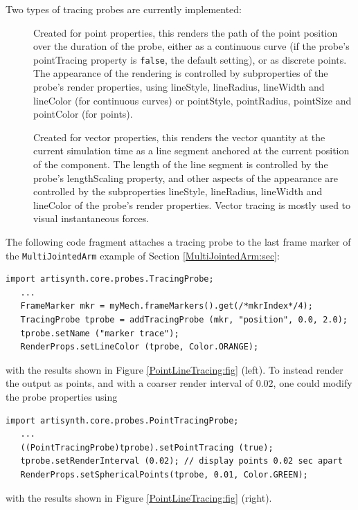 Two types of tracing probes are currently implemented:

\begin{description}

\item[]\mbox{}

Created for point properties, this renders the path of the point position over
the duration of the probe, either as a continuous curve (if the probe's {\sf
pointTracing} property is {\tt false}, the default setting), or as discrete
points. The appearance of the rendering is controlled by subproperties of the
probe's render properties, using {\sf lineStyle}, {\sf lineRadius}, {\sf
lineWidth} and {\sf lineColor} (for continuous curves) or {\sf pointStyle},
{\sf pointRadius}, {\sf pointSize} and {\sf pointColor} (for points).

\item[]\mbox{}

Created for vector properties, this renders the vector quantity at the current
simulation time as a line segment anchored at the current position of the
component. The length of the line segment is controlled by the probe's {\sf
lengthScaling} property, and other aspects of the appearance are controlled by
the subproperties {\sf lineStyle}, {\sf lineRadius}, {\sf lineWidth} and {\sf
lineColor} of the probe's render properties. Vector tracing is mostly used to
visual instantaneous forces.

\end{description}

The following code fragment attaches a tracing probe to the last frame marker
of the {\tt MultiJointedArm} example of Section \ref{MultiJointedArm:sec}:
%
\begin{lstlisting}[]
import artisynth.core.probes.TracingProbe;
   ...
   FrameMarker mkr = myMech.frameMarkers().get(/*mkrIndex*/4);
   TracingProbe tprobe = addTracingProbe (mkr, "position", 0.0, 2.0);
   tprobe.setName ("marker trace");
   RenderProps.setLineColor (tprobe, Color.ORANGE);
\end{lstlisting}
%
with the results shown in Figure \ref{PointLineTracing:fig} (left).  To instead
render the output as points, and with a coarser render interval of 0.02, one
could modify the probe properties using
%
\begin{lstlisting}[]
import artisynth.core.probes.PointTracingProbe;
   ...
   ((PointTracingProbe)tprobe).setPointTracing (true);
   tprobe.setRenderInterval (0.02); // display points 0.02 sec apart
   RenderProps.setSphericalPoints(tprobe, 0.01, Color.GREEN);
\end{lstlisting}
%
with the results shown in Figure \ref{PointLineTracing:fig} (right).

